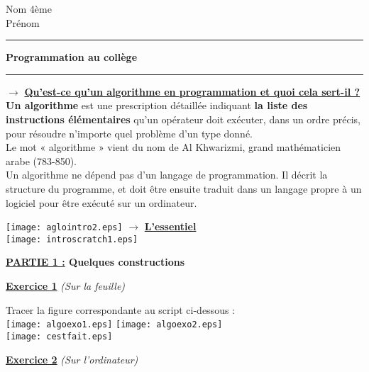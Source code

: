 \documentclass[a4paper,11pt]{article}
\newcommand{\titre}[5] 
{
\noindent #2 \hfill #4 \\
#3 \hfill #5

\vspace{-1.6cm}

\begin{center}\rule{6cm}{0.5mm}\end{center}
\vspace{0.2cm}
\begin{center}{\large{\textbf{#1}}}\end{center}
\begin{center}\rule{6cm}{0.5mm}\end{center}
}
\begin{document}
\pagestyle{empty}
\titre{Programmation au collège}{Nom}{Prénom}{4ème}{}

\vspace*{0.5cm}

$\rightarrow$ \textbf{\underline{Qu'est-ce qu'un algorithme en programmation et quoi cela sert-il ?}}\\

 \textbf{Un algorithme} est une prescription détaillée indiquant \textbf{la liste des instructions élémentaires} qu'un opérateur doit exécuter, dans un ordre précis, pour résoudre n'importe quel problème d'un type donné.\\

Le mot « algorithme » vient du nom de  Al Khwarizmi, grand mathématicien arabe (783-850).\\

Un algorithme ne dépend pas d'un langage de programmation. Il décrit la structure du programme, et doit être ensuite traduit dans un langage propre à un logiciel pour être exécuté sur un ordinateur.\\

\vspace*{0.5cm}

\texttt{[image: aglointro2.eps]} $\rightarrow$ \textbf{{\large \underline{L'essentiel }}}\\

\texttt{[image: introscratch1.eps]} \\

\newpage

\begin{flushleft}
{\large \textbf{\underline{PARTIE 1 :} Quelques constructions}}
\end{flushleft}\begin{center}
\textbf{{\large \underline{Exercice 1}}} \textit{(Sur la feuille)}
\end{center}

Tracer la figure correspondante au script ci-dessous :\\

\texttt{[image: algoexo1.eps]} \hspace*{2cm} \texttt{[image: algoexo2.eps]} \\

\texttt{[image: cestfait.eps]} \\

\begin{center}
\textbf{{\large \underline{Exercice 2}}} \textit{(Sur l'ordinateur)}
\end{center}
\end{document}
